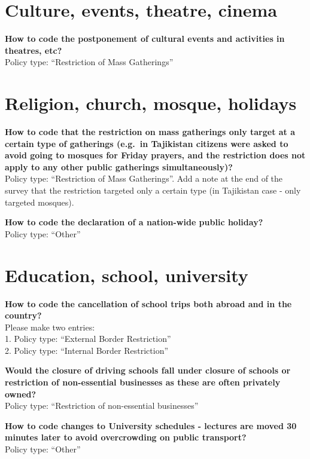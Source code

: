 \documentclass[
]{book}
\begin{document}
\hypertarget{culture-events-theatre-cinema}{%
\section{Culture, events, theatre, cinema}\label{culture-events-theatre-cinema}}

\textbf{How to code the postponement of cultural events and activities in theatres, etc?}\\
Policy type: ``Restriction of Mass Gatherings''

\hypertarget{religion-church-mosque-holidays}{%
\section{Religion, church, mosque, holidays}\label{religion-church-mosque-holidays}}

\textbf{How to code that the restriction on mass gatherings only target at a certain type of gatherings (e.g.~in Tajikistan citizens were asked to avoid going to mosques for Friday prayers, and the restriction does not apply to any other public gatherings simultaneously)?}\\
Policy type: ``Restriction of Mass Gatherings''. Add a note at the end of the survey that the restriction targeted only a certain type (in Tajikistan case - only targeted mosques).

\textbf{How to code the declaration of a nation-wide public holiday?}\\
Policy type: ``Other''

\hypertarget{education-school-university}{%
\section{Education, school, university}\label{education-school-university}}

\textbf{How to code the cancellation of school trips both abroad and in the country?}\\
Please make two entries:\\
1. Policy type: ``External Border Restriction''\\
2. Policy type: ``Internal Border Restriction''

\textbf{Would the closure of driving schools fall under closure of schools or restriction of non-essential businesses as these are often privately owned?}\\
Policy type: ``Restriction of non-essential businesses''

\textbf{How to code changes to University schedules - lectures are moved 30 minutes later to avoid overcrowding on public transport?}\\
Policy type: ``Other''
\end{document}
